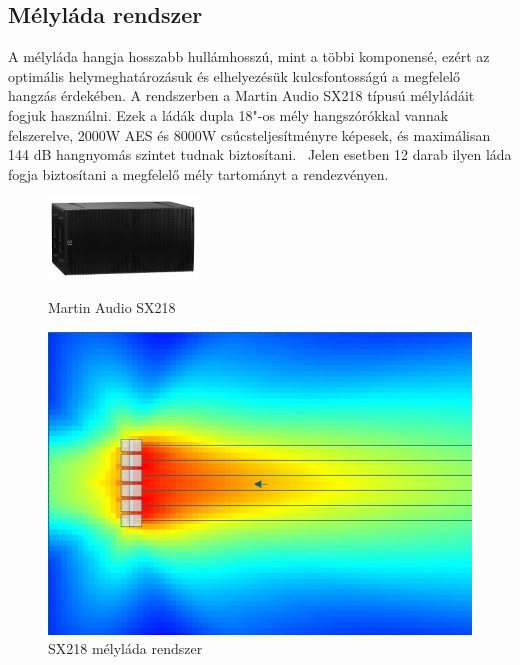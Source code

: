 \subsection{Mélyláda rendszer}
A mélyláda hangja hosszabb hullámhosszú, mint a többi komponensé, ezért az
optimális helymeghatározásuk és elhelyezésük kulcsfontosságú a megfelelő
hangzás érdekében. 
A rendszerben a Martin Audio SX218 típusú mélyládáit fogjuk használni.
Ezek a ládák dupla 18"-os mély hangszórókkal vannak felszerelve, 2000W AES és 8000W csúcsteljesítményre képesek, és
maximálisan 144 dB hangnyomás szintet tudnak biztosítani.~\cite{SXSUBWOOFERUSERGUIDE}
Jelen esetben 12 darab ilyen láda fogja biztosítani a megfelelő mély tartományt a rendezvényen.
\begin{figure}[H]
    \centering
    \begin{minipage}{0.45\textwidth}
		\centering
		\includegraphics[width=150px, keepaspectratio]{figures/sx218_front_view.jpg}
		\caption{Martin Audio SX218}\label{fig:sx218}
    \end{minipage}\hfill
    \begin{minipage}{0.45\textwidth}
        \centering
        \includegraphics[width=\linewidth, keepaspectratio]{figures/sub_array_63hz.jpg}
        \caption{SX218 mélyláda rendszer}\label{fig:sub_array_63hz}
    \end{minipage}
\end{figure}
